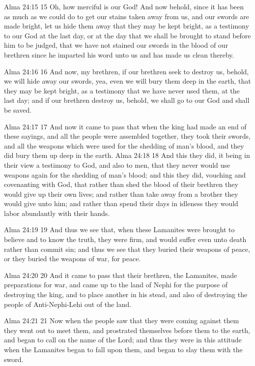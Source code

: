 Alma 24:15
 15 Oh, how merciful is our God! And now behold, since it has
been as much as we could do to get our stains taken away from us,
and our swords are made bright, let us hide them away that they
may be kept bright, as a testimony to our God at the last day, or
at the day that we shall be brought to stand before him to be
judged, that we have not stained our swords in the blood of our
brethren since he imparted his word unto us and has made us clean
thereby.

Alma 24:16
 16 And now, my brethren, if our brethren seek to destroy us,
behold, we will hide away our swords, yea, even we will bury them
deep in the earth, that they may be kept bright, as a testimony
that we have never used them, at the last day; and if our
brethren destroy us, behold, we shall go to our God and shall be
saved.

Alma 24:17
 17 And now it came to pass that when the king had made an end of
these sayings, and all the people were assembled together, they
took their swords, and all the weapons which were used for the
shedding of man's blood, and they did bury them up deep in the
earth.
Alma 24:18
 18 And this they did, it being in their view a testimony to God,
and also to men, that they never would use weapons again for the
shedding of man's blood; and this they did, vouching and
covenanting with God, that rather than shed the blood of their
brethren they would give up their own lives; and rather than take
away from a brother they would give unto him; and rather than
spend their days in idleness they would labor abundantly with
their hands.

Alma 24:19
 19 And thus we see that, when these Lamanites were brought to
believe and to know the truth, they were firm, and would suffer
even unto death rather than commit sin; and thus we see that they
buried their weapons of peace, or they buried the weapons of war,
for peace.

Alma 24:20
 20 And it came to pass that their brethren, the Lamanites, made
preparations for war, and came up to the land of Nephi for the
purpose of destroying the king, and to place another in his
stead, and also of destroying the people of Anti-Nephi-Lehi out
of the land.

Alma 24:21
 21 Now when the people saw that they were coming against them
they went out to meet them, and prostrated themselves before them
to the earth, and began to call on the name of the Lord; and thus
they were in this attitude when the Lamanites began to fall upon
them, and began to slay them with the sword.

